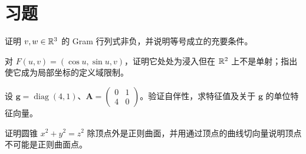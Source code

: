 \section{习题}
\begin{exercise}\label{ex:dg-tools-gram}
证明 $v,w\in\mathbb R^3$ 的 Gram 行列式非负，并说明等号成立的充要条件。
\end{exercise}
\begin{exercise}\label{ex:dg-tools-immersion}
对 $F(u,v)=(\cos u,\sin u,v)$，证明它处处为浸入但在 $\mathbb R^2$ 上不是单射；指出使它成为局部坐标的定义域限制。
\end{exercise}
\begin{exercise}\label{ex:dg-tools-selfadjoint}
设 $\mathbf g=\operatorname{diag}(4,1)$、$\mathbf A=\begin{pmatrix}0&1\\4&0\end{pmatrix}$。验证自伴性，求特征值及关于 $\mathbf g$ 的单位特征向量。
\end{exercise}
\begin{exercise}\label{ex:dg-tools-cone}
证明圆锥 $x^2+y^2=z^2$ 除顶点外是正则曲面，并用通过顶点的曲线切向量说明顶点不可能是正则曲面点。
\end{exercise}

